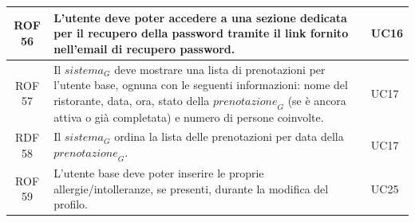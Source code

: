 \documentclass[12pt, oneside]{article}
\begin{document}
\begin{longtable}{|c|p{14cm}|p{2cm}|}
    \hline
    ROF 56 & L'utente deve poter accedere a una sezione dedicata per il recupero della password tramite il link fornito nell'email di recupero password.  & UC16 \\
    \hline
    ROF 57 & Il $\textit{sistema}_G$ deve mostrare una lista di prenotazioni per l'utente base, ognuna con le seguenti informazioni:
    nome del ristorante, data, ora, stato della $\textit{prenotazione}_G$ (se è ancora attiva o già completata) e numero di persone coinvolte. & UC17 \\
    \hline
    RDF 58 & Il $\textit{sistema}_G$ ordina la lista delle prenotazioni per data della $\textit{prenotazione}_G$.  & UC17 \\
    \hline

    ROF 59 & L'utente base deve poter inserire le proprie allergie/intolleranze, se presenti, durante la modifica del profilo.  & UC25  \\
    \hline


\end{longtable}
\end{document}
